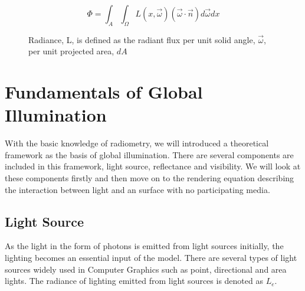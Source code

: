 \begin{equation}
\Phi = \int_{A}\int_{\Omega}L(x, \overrightarrow{\omega})(\overrightarrow{\omega} \cdot \overrightarrow{n})d\overrightarrow{\omega}dx
\label{eq:flux_from_radiance}
\end{equation}


\begin{figure}[htp]
    \centering
    \renewcommand{\thefigure}{\thechapter.\arabic{figure}}
    \caption[Geometric setup of radiance and solid angle]{Radiance, L, is defined as the radiant flux per unit solid angle, \(\overrightarrow{\omega}\), per unit projected area, \(dA\)}
    \label{fig:radiance_solid_angle}
\end{figure}


\section{Fundamentals of Global Illumination}
With the basic knowledge of radiometry, we will introduced a theoretical framework as the basis of global illumination. There are several components are included in this framework, light source, reflectance and visibility. We will look at these components firstly and then move on to the rendering equation describing the interaction between light and an surface with no participating media.

\subsection{Light Source}
As the light in the form of photons is emitted from light sources initially, the lighting becomes an essential input of the model. There are several types of light sources widely used in Computer Graphics such as point, directional and area lights. The radiance of lighting emitted from light sources is denoted as \( L_{e} \).

